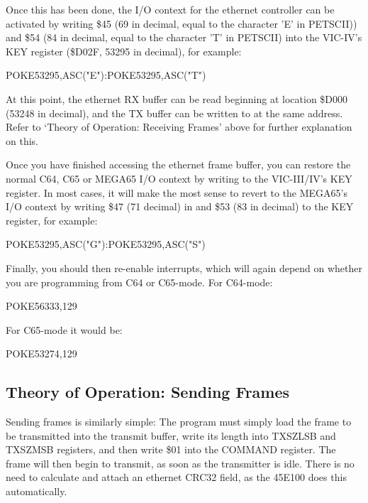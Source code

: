 Once this has been done, the I/O context for the ethernet controller can be activated by writing \$45 (69 in decimal, equal to the character 'E' in PETSCII)) and \$54 (84 in decimal, equal to the character 'T' in PETSCII) into the VIC-IV's KEY register (\$D02F, 53295 in decimal), for example:

\begin{screenoutput}
POKE53295,ASC("E"):POKE53295,ASC("T")
\end{screenoutput}

At this point, the ethernet RX buffer can be read beginning at location \$D000 (53248 in decimal), and the TX buffer can be written to at the same address.  Refer to `Theory of Operation: Receiving Frames' above for further explanation on this.

Once you have finished accessing the ethernet frame buffer, you can restore the normal C64, C65 or MEGA65 I/O context by writing to the VIC-III/IV's KEY register.  In most cases, it will make the most sense to revert to the MEGA65's I/O context by writing \$47 (71 decimal) in and \$53 (83 in decimal) to the KEY register, for example:

\begin{screenoutput}
POKE53295,ASC("G"):POKE53295,ASC("S")
\end{screenoutput}

Finally, you should then re-enable interrupts, which will again depend on whether you are programming from C64 or C65-mode.  For C64-mode:

\begin{screenoutput}
POKE56333,129
\end{screenoutput}

For C65-mode it would be:

\begin{screenoutput}
POKE53274,129
\end{screenoutput}



\subsection{Theory of Operation: Sending Frames}

Sending frames is similarly simple: The program must simply load the frame to be transmitted into
the transmit buffer, write its length into TXSZLSB and TXSZMSB registers, and then write \$01 into
the COMMAND register.  The frame will then begin to transmit, as soon as the transmitter is idle.
There is no need to calculate and attach an ethernet CRC32 field, as the 45E100 does this automatically.

